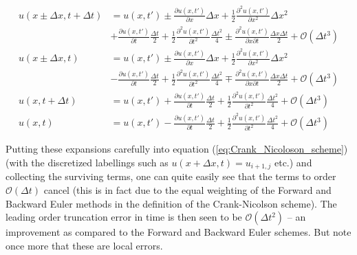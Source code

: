 \documentclass[a4paper, 11pt, notitlepage,english]{article}
\begin{document}
\begin{align}
u(x\pm\Delta x,t+\Delta t) &= u(x,t') \pm \frac{\partial u(x,t')}{\partial x}\Delta x + \frac{1}{2}\frac{\partial^2 u(x,t')}{\partial x^2}\Delta x^2  \nonumber \\
&+ \frac{\partial u(x,t')}{\partial t}\frac{\Delta t}{2} + \frac{1}{2}\frac{\partial^2 u(x,t')}{\partial t^2}\frac{\Delta t^2}{4} \pm \frac{\partial^2 u(x,t')}{\partial x \partial t}\frac{\Delta x \Delta t}{2} + \mathcal{O}(\Delta t^3)
\label{eq:Crank_Nicolson_expansions1} \\
u(x\pm\Delta x,t) &= u(x,t') \pm \frac{\partial u(x,t')}{\partial x}\Delta x + \frac{1}{2}\frac{\partial^2 u(x,t')}{\partial x^2}\Delta x^2 \nonumber \\
&- \frac{\partial u(x,t')}{\partial t}\frac{\Delta t}{2} + \frac{1}{2}\frac{\partial^2 u(x,t')}{\partial t^2}\frac{\Delta t^2}{4} \mp \frac{\partial^2 u(x,t')}{\partial x \partial t}\frac{\Delta x \Delta t}{2} + \mathcal{O}(\Delta t^3)
\label{eq:Crank_Nicolson_expansion2} \\
u(x,t+\Delta t) &= u(x,t') + \frac{\partial u(x,t')}{\partial t}\frac{\Delta t}{2} + \frac{1}{2}\frac{\partial^2 u(x,t')}{\partial t^2}\frac{\Delta t^2}{4}  + \mathcal{O}(\Delta t^3)
\label{eq:Crank_Nicolson_expansion3} \\
u(x,t) &= u(x,t') - \frac{\partial u(x,t')}{\partial t}\frac{\Delta t}{2} + \frac{1}{2}\frac{\partial^2 u(x,t')}{\partial t^2}\frac{\Delta t^2}{4}  + \mathcal{O}(\Delta t^3)
\label{eq:Crank_Nicolson_expansion4}
\end{align}

Putting these expansions carefully into equation (\ref{eq:Crank_Nicoloson_scheme}) (with the discretized labellings such as $u(x+\Delta x,t) = u_{i+1,j}$ etc.) and collecting the surviving terms, one can quite easily see that the terms to order $\mathcal{O}(\Delta t)$ cancel (this is in fact due to the equal weighting of the Forward and Backward Euler methods in the definition of the Crank-Nicolson scheme). The leading order truncation error in time is then seen to be $\mathcal{O}(\Delta t^2)$ – an improvement as compared to the Forward and Backward Euler schemes. But note once more that these are local errors. \\
\end{document}
